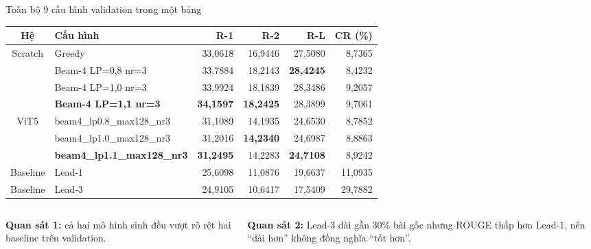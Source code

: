 \documentclass[aspectratio=169,10pt]{beamer}
\newcommand{\selectedrow}{\rowcolor{SoftYellow}}
\begin{document}
\begin{frame}{Toàn bộ 9 cấu hình validation trong một bảng}
  \centering
  \scriptsize
  \setlength{\tabcolsep}{4.1pt}
  \renewcommand{\arraystretch}{1.16}
  \begin{tabular}{clrrrr}
    \toprule
    \textbf{Hệ} & \textbf{Cấu hình} & \textbf{R-1} & \textbf{R-2} & \textbf{R-L} & \textbf{CR (\%)}\\
    \midrule
    \multirow{4}{*}{Scratch}
      & Greedy & 33,0618 & 16,9446 & 27,5080 & 8,7365\\
      & Beam-4 LP=0,8 nr=3 & 33,7884 & 18,2143 & \textbf{28,4245} & 8,4232\\
      & Beam-4 LP=1,0 nr=3 & 33,9924 & 18,1839 & 28,3486 & 9,2057\\
    \selectedrow
      & \textbf{Beam-4 LP=1,1 nr=3} & \textbf{34,1597} & \textbf{18,2425} & 28,3899 & 9,7061\\
    \midrule
    \multirow{3}{*}{ViT5}
      & beam4\_lp0.8\_max128\_nr3 & 31,1089 & 14,1935 & 24,6530 & 8,7852\\
      & beam4\_lp1.0\_max128\_nr3 & 31,2016 & \textbf{14,2340} & 24,6987 & 8,8863\\
    \selectedrow
      & \textbf{beam4\_lp1.1\_max128\_nr3} & \textbf{31,2495} & 14,2283 & \textbf{24,7108} & 8,9242\\
    \midrule
    Baseline & Lead-1 & 25,6098 & 11,0876 & 19,6637 & 11,0935\\
    Baseline & Lead-3 & 24,9105 & 10,6417 & 17,5409 & 29,7882\\
    \bottomrule
  \end{tabular}
  \vspace{2.5mm}
  \begin{columns}[T,onlytextwidth]
      \begin{softbox}
        \small\textbf{Quan sát 1:} cả hai mô hình sinh đều vượt rõ rệt hai baseline trên validation.
      \end{softbox}
      \begin{softbox}
        \small\textbf{Quan sát 2:} Lead-3 dài gần 30\% bài gốc nhưng ROUGE thấp hơn Lead-1, nên “dài hơn” không đồng nghĩa “tốt hơn”.
      \end{softbox}
  \end{columns}
\end{frame}
\end{document}
